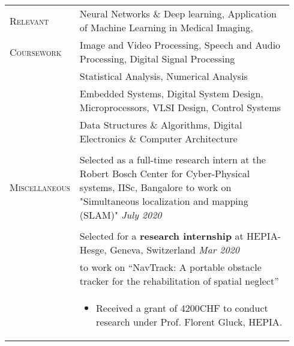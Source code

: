 \documentclass[letterpaper, 10pt, oneside]{article}
\newcommand{\stitle}[1]{\normalsize{\textsc{#1}}}
\begin{document}
\begin{longtable}{@{} p{0.14\linewidth} p{0.8\linewidth}}
\stitle{Relevant}   & Neural Networks \& Deep learning, Application of Machine Learning in Medical Imaging,  \\
\stitle{Coursework} & Image and Video Processing, Speech and Audio Processing, Digital Signal Processing\\
                    & Statistical Analysis, Numerical Analysis \\
                    & Embedded Systems, Digital System Design, Microprocessors, VLSI Design, Control Systems \\
                    & Data Structures \& Algorithms, Digital Electronics \& Computer Architecture \\
\\


\stitle{Miscellaneous} 
    & Selected as a full-time research intern at the Robert Bosch Center for Cyber-Physical systems, IISc, Bangalore to work on "Simultaneous localization and mapping (SLAM)" \hfill \textit{July 2020} \\ 
\\
    
    & Selected for a \textbf{research internship} at HEPIA-Hesge, Geneva, Switzerland \hfill \textit{Mar 2020} \\
    & to work on ``NavTrack: A portable obstacle tracker for the rehabilitation of spatial neglect''\\
    & \parbox{0.8\textwidth}{%
      \begin{itemize}[leftmargin=6ex, itemsep=-0.88ex, topsep=-0.88ex]
          \item Received a grant of 4200CHF to conduct research under Prof. Florent Gluck, HEPIA.
      \end{itemize}
    }  
\\

\end{longtable}
\end{document}
